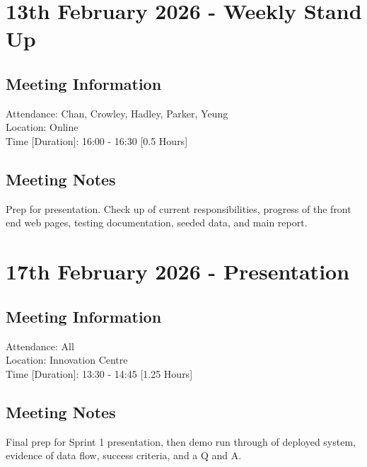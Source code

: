 \documentclass[]{report}
\begin{document}
	\section*{13th February 2026 - Weekly Stand Up}
	\subsection*{Meeting Information}
	Attendance: Chan, Crowley, Hadley, Parker, Yeung\\
	Location: Online\\
	Time [Duration]: 16:00 - 16:30 [0.5 Hours]
	\subsection*{Meeting Notes}
	Prep for presentation. Check up of current responsibilities, progress of the front end web pages, testing documentation, seeded data, and main report.
	\section*{17th February 2026 - Presentation}
	\subsection*{Meeting Information}
	Attendance: All\\
	Location: Innovation Centre\\
	Time [Duration]: 13:30 - 14:45 [1.25 Hours]
	\subsection*{Meeting Notes}
	Final prep for Sprint 1 presentation, then demo run through of deployed system, evidence of data flow, success criteria, and a Q and A.
	
	
\end{document}
